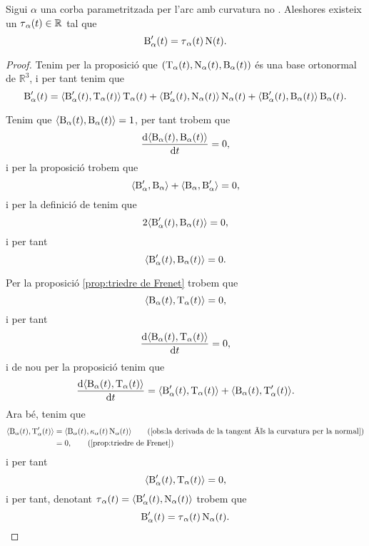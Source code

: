 \documentclass[../Apunts.tex]{subfiles}
\begin{document}
	\begin{proposition}
		\label{prop:torsió}
		Sigui \(\alpha\) una corba parametritzada per l'arc amb curvatura no \nulla{}. Aleshores existeix un \(\operatorname{\tau}_{\alpha}(t)\in\mathbb{R}\) tal que
		\[\operatorname{B}'_{\alpha}(t)=\operatorname{\tau}_{\alpha}(t)\operatorname{N}(t).\]
		\begin{proof}
			Tenim per la proposició  que \((\operatorname{T}_{\alpha}(t),\operatorname{N}_{\alpha}(t),\operatorname{B}_{\alpha}(t))\) és una base ortonormal de \(\mathbb{R}^{3}\), i per tant tenim que %
			\[\binormal'_{\alpha}(t)=\prodesc{\binormal'_{\alpha}(t)}{\tangent_{\alpha}(t)}\tangent_{\alpha}(t)+\prodesc{\binormal'_{\alpha}(t)}{\normal_{\alpha}(t)}\normal_{\alpha}(t)+\prodesc{\binormal'_{\alpha}(t)}{\binormal_{\alpha}(t)}\binormal_{\alpha}(t).\]
			
			Tenim que \(\prodesc{\binormal_{\alpha}(t)}{\binormal_{\alpha}(t)}=1\), per tant trobem que
			\[\frac{\diff\prodesc{\binormal_{\alpha}(t)}{\binormal_{\alpha}(t)}}{\diff t}=0,\]
			i per la proposició  trobem que
			\[\prodesc{\binormal'_{\alpha}}{\binormal_{\alpha}}+\prodesc{\binormal_{\alpha}}{\binormal'_{\alpha}}=0,\]
			i per la definició de  tenim que
			\[2\prodesc{\binormal'_{\alpha}(t)}{\binormal_{\alpha}(t)}=0,\]
			i per tant
			\[\prodesc{\binormal'_{\alpha}(t)}{\binormal_{\alpha}(t)}=0.\]
			
			Per la proposició \ref{prop:triedre de Frenet} trobem que
			\[\prodesc{\binormal_{\alpha}(t)}{\tangent_{\alpha}(t)}=0,\]
			i per tant
			\[\frac{\diff\prodesc{\binormal_{\alpha}(t)}{\tangent_{\alpha}(t)}}{\diff t}=0,\]
			i de nou per la proposició  tenim que
			\[\frac{\diff\prodesc{\binormal_{\alpha}(t)}{\tangent_{\alpha}(t)}}{\diff t}=\prodesc{\binormal'_{\alpha}(t)}{\tangent_{\alpha}(t)}+\prodesc{\binormal_{\alpha}(t)}{\tangent'_{\alpha}(t)}.\]
			Ara bé, tenim que
			\begin{align*}
				\prodesc{\binormal_{\alpha}(t)}{\tangent'_{\alpha}(t)}&=\prodesc{\binormal_{\alpha}(t)}{\curvatura_{\alpha}(t)\normal_{\alpha}(t)} \tag{\ref{obs:la derivada de la tangent és la curvatura per la normal}} \\
				&=0, \tag{\ref{prop:triedre de Frenet}}
			\end{align*}
			i per tant
			\[\prodesc{\binormal'_{\alpha}(t)}{\tangent_{\alpha}(t)}=0,\]
			i per tant, denotant \(\torsio_{\alpha}(t)=\prodesc{\binormal'_{\alpha}(t)}{\normal_{\alpha}(t)}\) trobem que
			\[\operatorname{B}'_{\alpha}(t)=\operatorname{\tau}_{\alpha}(t)\operatorname{N}_{\alpha}(t).\qedhere\]
		\end{proof}
	\end{proposition}
\end{document}
